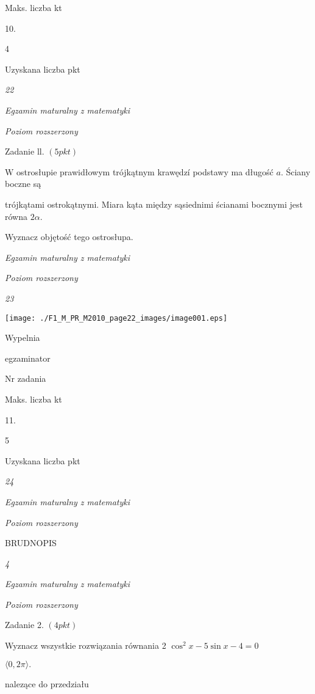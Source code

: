 \documentclass[a4paper,12pt]{article}
\begin{document}
Maks. liczba kt

10.

4

Uzyskana liczba pkt





{\it 22}

{\it Egzamin maturalny z matematyki}

{\it Poziom rozszerzony}

Zadanie ll. $(5pkt)$

$\mathrm{W}$ ostrosłupie prawidłowym trójkątnym krawędzí podstawy ma długość $a$. Ściany boczne są

trójkątami ostrokątnymi. Miara kąta między sąsiednimi ścianami bocznymi jest równa $2\alpha.$

Wyznacz objętość tego ostrosłupa.





{\it Egzamin maturalny z matematyki}

{\it Poziom rozszerzony}

{\it 23}
\begin{center}
\texttt{[image: ./F1\_M\_PR\_M2010\_page22\_images/image001.eps]}
\end{center}
Wypelnia

egzaminator

Nr zadania

Maks. liczba kt

11.

5

Uzyskana liczba pkt





{\it 24}

{\it Egzamin maturalny z matematyki}

{\it Poziom rozszerzony}

BRUDNOPIS





{\it 4}

{\it Egzamin maturalny z matematyki}

{\it Poziom rozszerzony}

Zadanie 2. $(4pkt)$

Wyznacz wszystkie rozwiązania równania 2 $\cos^{2}x-5\sin x-4=0$

$\langle 0, 2\pi\rangle.$

nalezące do przedziału
\end{document}
